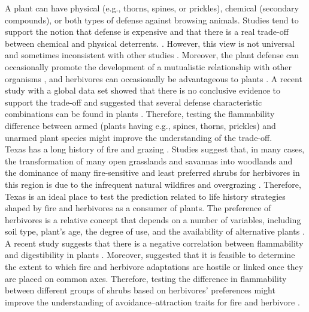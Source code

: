 \documentclass[12pt]{report}
\begin{document}
A plant can have physical (e.g., thorns, spines, or prickles), chemical (secondary compounds), or both types of defense against browsing animals. Studies tend to support the notion that defense is expensive and that there is a real trade-off between chemical and physical deterrents. \citep{rhoades1979evolution, van1988defence,twigg1996physicalchemical}. However, this view is not universal and sometimes inconsistent with other studies \citep{iddles2003potentialnegativecorrelation,steward1988theredifferentview,koricheva2004metanegativecorrelation}. Moreover, the plant defense can occasionally promote the development of a mutualistic relationship with other organisms \citep{janzen1966coevolution}, and herbivores can occasionally be advantageous to plants \citep{belsky1986does}. A recent study with a global data set showed that there is no conclusive evidence to support the trade-off and suggested that several defense characteristic combinations can be found in plants \citep{moles2013correlations}. Therefore, testing the flammability difference between armed (plants having e.g., spines, thorns, prickles) and unarmed plant species might improve the understanding of the trade-off.\\

Texas has a long history of fire \citep{moir1982firehistory, stambaugh2011firehistory,stambaugh2014historicalfirehistory,smeins2005historyoffire1} and grazing \citep{buechner1950lifegrazing, wilcox2012historicalgrazing2}. Studies suggest that, in many cases, the transformation of many open grasslands and savannas into woodlands and the dominance of many fire-sensitive and least preferred shrubs for herbivores in this region is due to the infrequent natural wildfires and overgrazing \citep{archer1989havejoint,andruk2014joint, masters1986prescribed}. Therefore, Texas is an ideal place to test the prediction related to life history strategies shaped by fire and herbivores as a consumer of plants. The preference of herbivores is a relative concept that depends on a number of variables, including soil type, plant's age, the degree of use, and the availability of alternative plants \citep{wright2003white}.  A recent study suggests that there is a negative correlation between flammability and digestibility in plants \citep{gowda2022digestibility}. Moreover, \citep{archibald2019unified} suggested that it is feasible to determine the extent to which fire and herbivore adaptations are hostile or linked once they are placed on common axes. Therefore, testing the difference in flammability between different groups of shrubs based on herbivores' preferences might improve the understanding of avoidance–attraction traits for fire and herbivore \citep{schwilk2003flammability, archibald2019unified}. 
\end{document}
